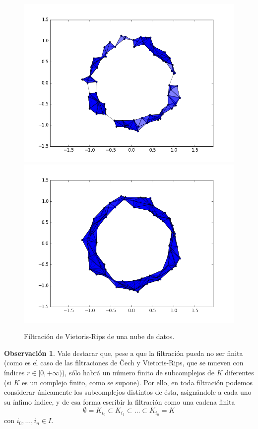 \documentclass[12pt,a4paper,twoside]{article} %
\theoremstyle{plain}
\theoremstyle{definition}
\newtheorem{observacion}{Observación}[subsection]
\begin{document}
\begin{figure}[h!]
\includegraphics[scale=0.28]{img/figure_4.png}
\includegraphics[scale=0.28]{img/figure_5.png}
\caption{Filtración de Vietoris-Rips de una nube de datos.}
\label{filtracion}
\end{figure}

\begin{observacion}
Vale destacar que, pese a que la filtración pueda no ser finita (como es el caso de las filtraciones de Čech y Vietoris-Rips, que se mueven con índices $r \in [0,+\infty)$), sólo habrá un número finito de subcomplejos de $K$ diferentes (si $K$ es un complejo finito, como se supone). Por ello, en toda filtración podemos considerar únicamente los subcomplejos distintos de ésta, asignándole a cada uno su ínfimo índice, y de esa forma escribir la filtración como una cadena finita 
$$ \emptyset = K_{i_0} \subset K_{i_1} \subset \dots \subset K_{i_n} = K $$
con $i_0,\dots,i_n \in I$.
\end{observacion}
\end{document}
